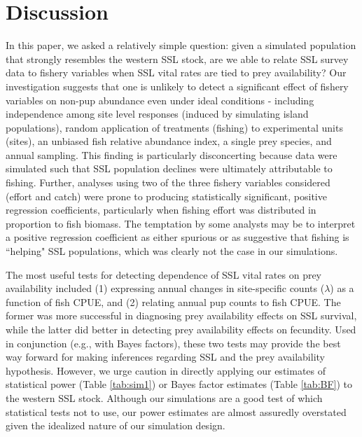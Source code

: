 \documentclass[nonumbib,leqno]{nrc1}
\begin{document}
\section{Discussion}

In this paper, we asked a relatively simple question: given a simulated population that strongly resembles the western SSL stock, are we able to relate SSL survey data to fishery variables when SSL vital rates are tied to prey availability? Our investigation suggests that one is unlikely to detect a significant effect of fishery variables on non-pup abundance even under ideal conditions - including independence among site level responses (induced by simulating island populations), random application of treatments (fishing) to experimental units (sites), an unbiased fish relative abundance index, a single prey species, and annual sampling.  This finding is particularly disconcerting because data were simulated such that SSL population declines were ultimately attributable to fishing.  Further, analyses using two of the three fishery variables considered (effort and catch) were prone to producing statistically significant, positive regression coefficients, particularly when fishing effort was distributed in proportion to fish biomass.  The temptation by some analysts may be to interpret a positive regression coefficient as either spurious or as suggestive that fishing is ``helping" SSL populations, which was clearly not the case in our simulations.

The most useful tests for detecting dependence of SSL vital rates on prey availability included (1) expressing annual changes in site-specific counts ($\lambda$) as a function of fish CPUE, and (2) relating annual pup counts to fish CPUE.  The former was more successful in diagnosing prey availability effects on SSL survival, while the latter did better in detecting prey availability effects on fecundity.  Used in conjunction (e.g., with Bayes factors), these two tests may provide the best way forward for making inferences regarding SSL and the prey availability hypothesis.  However, we urge caution in directly applying our estimates of statistical power (Table \ref{tab:sim1}) or Bayes factor estimates (Table \ref{tab:BF}) to the western SSL stock.  Although our simulations are a good test of which statistical tests not to use, our power estimates are almost assuredly overstated given the idealized nature of our simulation design.
\end{document}
